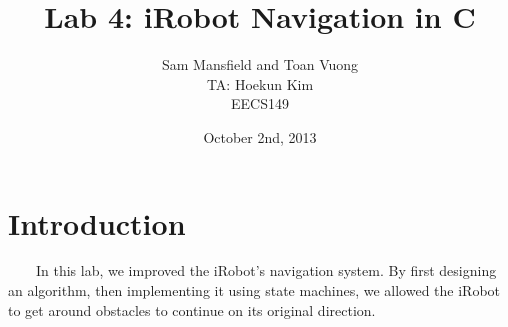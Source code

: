 \documentclass[10pt,titlepage]{article}
\begin{document}
  \title{Lab 4: iRobot Navigation in C}
  \author{Sam Mansfield and Toan Vuong\\
          TA: Hoekun Kim\\ 
          EECS149}
  \date{October 2nd, 2013}
  \maketitle

  \section{Introduction} 
  \ \ \ \ In this lab, we improved the iRobot's navigation system. By first designing an algorithm, then implementing it using state machines, we allowed the iRobot to get around obstacles to continue on its original direction. \\
\end{document}
